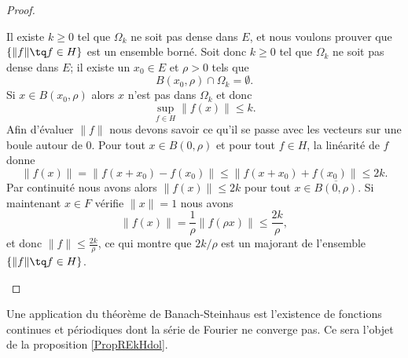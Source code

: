 \begin{proof}
\begin{subproof}
            Il existe \( k\geq 0\) tel que \( \Omega_k\) ne soit pas dense dans \( E\), et nous voulons prouver que \( \{ \| f \|\tq f\in H \}\) est un ensemble borné. Soit donc \( k\geq 0\) tel que \( \Omega_k\) ne soit pas dense dans \( E\); il existe un \( x_0\in E\) et \( \rho>0\) tels que 
            \begin{equation}
                B(x_0,\rho)\cap \Omega_k=\emptyset.
            \end{equation}
            Si \( x\in B(x_0,\rho)\) alors \( x\) n'est pas dans \( \Omega_k\) et donc
            \begin{equation}
                \sup_{f\in H}\| f(x) \|\leq k.
            \end{equation}
            Afin d'évaluer \( \| f \|\) nous devons savoir ce qu'il se passe avec les vecteurs sur une boule autour de \( 0\). Pour tout \( x\in B(0,\rho)\) et pour tout \( f\in H\), la linéarité de \( f\) donne
            \begin{equation}
                \| f(x) \|=\| f(x+x_0)-f(x_0) \|\leq \| f(x+x_0)+f(x_0) \|\leq 2k.
            \end{equation}
            Par continuité nous avons alors \( \| f(x) \|\leq 2k\) pour tout \( x\in \overline{ B(0,\rho) }\). Si maintenant \( x\in F\) vérifie \( \| x \|=1\) nous avons
            \begin{equation}
                \| f(x) \|=\frac{1}{ \rho }\| f(\rho x) \|\leq \frac{ 2k }{ \rho },
            \end{equation}
            et donc \( \| f \|\leq \frac{ 2k }{ \rho }\), ce qui montre que \( 2k/\rho\) est un majorant de l'ensemble \( \{ \| f \|\tq f\in H \}\).

    \end{subproof}

\end{proof}
Une application du théorème de Banach-Steinhaus est l'existence de fonctions continues et périodiques dont la série de Fourier ne converge pas. Ce sera l'objet de la proposition \ref{PropREkHdol}.

